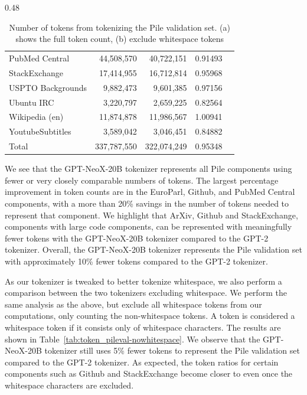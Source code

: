 \documentclass{article}
\newcommand{\model}{GPT-NeoX-20B}
\begin{document}
\begin{table}[ht!]
\begin{subtable}[h]{0.48\textwidth}
{\begin{tabular}{lrrcc}
    PubMed Central & 44,508,570 & 40,722,151 & 0.91493 \\
    StackExchange & 17,414,955 & 16,712,814 & 0.95968 \\
    USPTO Backgrounds & 9,882,473 & 9,601,385 & 0.97156 \\
    Ubuntu IRC & 3,220,797 & 2,659,225 & 0.82564 \\
    Wikipedia (en) & 11,874,878 & 11,986,567 & 1.00941 \\
    YoutubeSubtitles & 3,589,042 & 3,046,451 & 0.84882 \\
    \midrule
    Total & 337,787,550 & 322,074,249 & 0.95348 \\
    \bottomrule
\end{tabular}
}
\caption{Excluding whitespace tokens}
\label{tab:token_pileval-nowhitespace}
\end{subtable}
\caption{
    Number of tokens from tokenizing the Pile validation set. (a) shows the full token count, (b) exclude whitespace tokens
}
\label{tab:token_pileval}

\end{table}

We see that the \model{} tokenizer represents all Pile components using fewer or very closely comparable numbers of tokens. The largest percentage improvement in token counts are in the EuroParl, Github, and PubMed Central components, with a more than 20\% savings in the number of tokens needed to represent that component. We highlight that ArXiv, Github and StackExchange, components with large code components, can be represented with meaningfully fewer tokens with the \model{} tokenizer compared to the GPT-2 tokenizer. Overall, the \model{} tokenizer represents the Pile validation set with approximately 10\% fewer tokens compared to the GPT-2 tokenizer.

As our tokenizer is tweaked to better tokenize whitespace, we also perform a comparison between the two tokenizers excluding whitespace. We perform the same analysis as the above, but exclude all whitespace tokens from our computations, only counting the non-whitespace tokens. A token is considered a whitespace token if it consists only of whitespace characters. The results are shown in Table~\ref{tab:token_pileval-nowhitespace}. We observe that the \model{} tokenizer still uses 5\% fewer tokens to represent the Pile validation set compared to the GPT-2 tokenizer. As expected, the token ratios for certain components such as Github and StackExchange become closer to even once the whitespace characters are excluded. 
\end{document}
